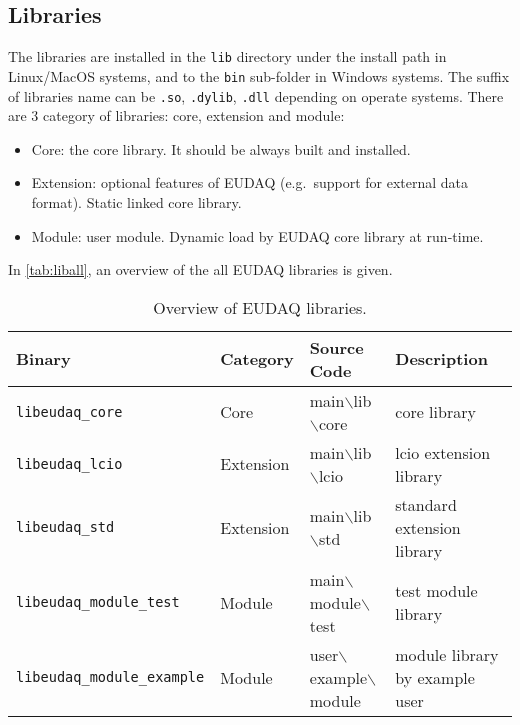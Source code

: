 \subsection{Libraries}
The libraries are installed in the \texttt{lib} directory under the install path in Linux/MacOS systems, and to the \texttt{bin} sub-folder in Windows systems. The suffix of libraries name can be \texttt{.so}, \texttt{.dylib}, \texttt{.dll} depending on operate systems. There are 3 category of libraries: core, extension and module: 

\begin{itemize}
\item Core: the core library. It should be always built and installed.
\item Extension: optional features of EUDAQ (e.g.\ support for external data format). Static linked core library.
\item Module: user module. Dynamic load by EUDAQ core library at run-time.
\end{itemize}

In \autoref{tab:liball}, an overview of the all EUDAQ libraries is given.\\

\begin{table}
\centering
\small
\begin{tabular}{ l | l | l | p{4cm}}
  \textbf{Binary} & \textbf{Category} & \textbf{Source Code} & \textbf{Description}\\
  \hline
  \hline
  \texttt{libeudaq\_core} & Core & main$\backslash$lib$\backslash$core & core library \\
  \hline
  \texttt{libeudaq\_lcio} & Extension & main$\backslash$lib$\backslash$lcio & lcio extension library \\
  \texttt{libeudaq\_std} & Extension & main$\backslash$lib$\backslash$std & standard extension library \\
  \hline
  \texttt{libeudaq\_module\_test} & Module & main$\backslash$module$\backslash$test & test module library \\
  \texttt{libeudaq\_module\_example} & Module & user$\backslash$example$\backslash$module &  module library by example user\\
\end{tabular}
\caption{Overview of EUDAQ libraries.}
\label{tab:liball}
\end{table}
